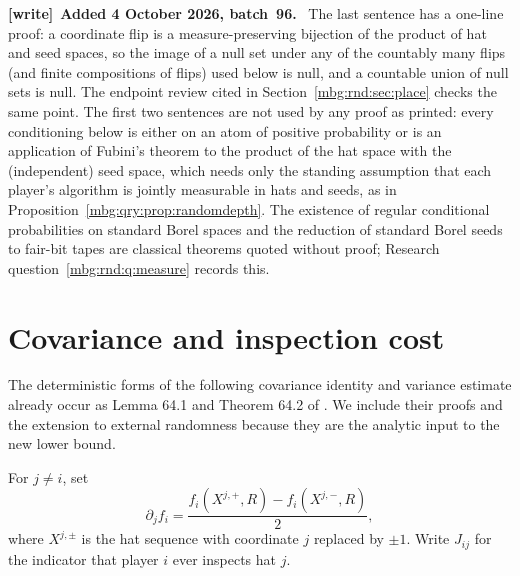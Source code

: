 \documentclass[11pt,letterpaper]{article}
\theoremstyle{definition}
\newenvironment{writenote}[1][]{\par\smallskip\begingroup\small
 \noindent\textbf{[write]}\if\relax\detokenize{#1}\relax\else~\textbf{#1.}\fi\ }%
 {\par\endgroup\smallskip}
\begin{document}
\begin{writenote}[Added 4 October 2026, batch~96]
The last sentence has a one-line proof: a coordinate flip is a measure-preserving bijection of the product of hat and seed spaces, so the image of a null set under any of the countably many flips (and finite compositions of flips) used below is null, and a countable union of null sets is null. The endpoint review cited in Section~\ref{mbg:rnd:sec:place} checks the same point. The first two sentences are not used by any proof as printed: every conditioning below is either on an atom of positive probability or is an application of Fubini's theorem to the product of the hat space with the (independent) seed space, which needs only the standing assumption that each player's algorithm is jointly measurable in hats and seeds, as in Proposition~\ref{mbg:qry:prop:randomdepth}. The existence of regular conditional probabilities on standard Borel spaces and the reduction of standard Borel seeds to fair-bit tapes are classical theorems quoted without proof; Research question~\ref{mbg:rnd:q:measure} records this.
\end{writenote}

\section{Covariance and inspection cost}
\label{mbg:rnd:sec:variance}

The deterministic forms of the following covariance identity and
variance estimate already occur as Lemma 64.1 and Theorem 64.2 of
\cite{rnd:ProveIt}. We include their proofs and the extension to external
randomness because they are the analytic input to the new lower bound.

For $j\ne i$, set
\[
 \partial_j f_i=
 \frac{f_i(X^{j,+},R)-f_i(X^{j,-},R)}{2},
\]
where $X^{j,\pm}$ is the hat sequence with coordinate $j$ replaced by
$\pm1$. Write $J_{ij}$ for the indicator that player $i$ ever inspects
hat $j$.
\end{document}

